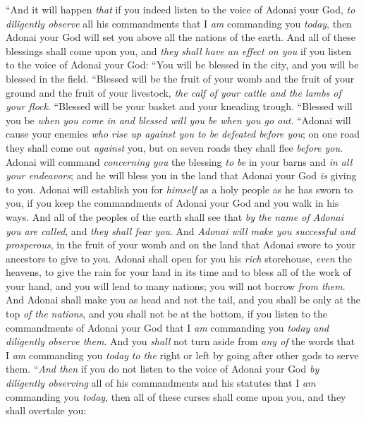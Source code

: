 \begin{biblechapter} %
\verse “And it will happen \textit{that} if you indeed listen to the voice of Adonai your God, \textit{to diligently observe} all his commandments that I \textit{am} commanding you \textit{today}, then Adonai your God will set you above all the nations of the earth.
\verse And all of these blessings shall come upon you, and \textit{they shall have an effect on you} if you listen to the voice of Adonai your God:
\verse “You will be blessed in the city, and you will be blessed in the field.
\verse “Blessed will be the fruit of your womb and the fruit of your ground and the fruit of your livestock, \textit{the calf of your cattle and the lambs of your flock}.
\verse “Blessed will be your basket and your kneading trough.
\verse “Blessed will you be \textit{when you come in and blessed will you be when you go out}.
\verse “Adonai will cause your enemies \textit{who rise up against you to be defeated before you}; on one road they shall come out \textit{against} you, but on seven roads they shall flee \textit{before you}.
\verse Adonai will command \textit{concerning you} the blessing \textit{to be} in your barns and \textit{in all your endeavors}; and he will bless you in the land that Adonai your God \textit{is} giving to you.
\verse Adonai will establish you for \textit{himself} as a holy people as he has sworn to you, if you keep the commandments of Adonai your God and you walk in his ways.
\verse And all of the peoples of the earth shall see that \textit{by the name of Adonai you are called}, and \textit{they shall fear you}.
\verse And \textit{Adonai will make you successful and prosperous}, in the fruit of your womb and on the land that Adonai swore to your ancestors to give to you.
\verse Adonai shall open for you his \textit{rich} storehouse, \textit{even} the heavens, to give the rain for your land in its time and to bless all of the work of your hand, and you will lend to many nations; you will not borrow \textit{from them}.
\verse And Adonai shall make you as head and not the tail, and you shall be only at the top \textit{of the nations}, and you shall not be at the bottom, if you listen to the commandments of Adonai your God that I \textit{am} commanding you \textit{today} \textit{and diligently observe them}.
\verse And you \textit{shall} not turn aside from \textit{any of} the words that I \textit{am} commanding you \textit{today} \textit{to the} right or left by going after other gods to serve them.
\verse “\textit{And then} if you do not listen to the voice of Adonai your God \textit{by diligently observing} all of his commandments and his statutes that I \textit{am} commanding you \textit{today}, then all of these curses shall come upon you, and they shall overtake you:

\end{biblechapter}
